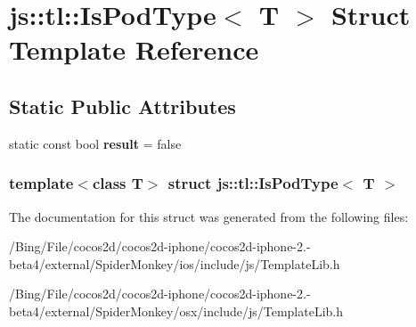 \hypertarget{structjs_1_1tl_1_1_is_pod_type}{\section{js\-:\-:tl\-:\-:Is\-Pod\-Type$<$ T $>$ Struct Template Reference}
\label{structjs_1_1tl_1_1_is_pod_type}
}
\subsection*{Static Public Attributes}
\begin{DoxyCompactItemize}
\item 
\hypertarget{structjs_1_1tl_1_1_is_pod_type_a50d8346c4465a22df722105604a09943}{static const bool {\bfseries result} = false}\label{structjs_1_1tl_1_1_is_pod_type_a50d8346c4465a22df722105604a09943}

\end{DoxyCompactItemize}
\subsubsection*{template$<$class T$>$ struct js\-::tl\-::\-Is\-Pod\-Type$<$ T $>$}



The documentation for this struct was generated from the following files\-:\begin{DoxyCompactItemize}
\item 
/\-Bing/\-File/cocos2d/cocos2d-\/iphone/cocos2d-\/iphone-\/2.-\/beta4/external/\-Spider\-Monkey/ios/include/js/Template\-Lib.\-h\item 
/\-Bing/\-File/cocos2d/cocos2d-\/iphone/cocos2d-\/iphone-\/2.-\/beta4/external/\-Spider\-Monkey/osx/include/js/Template\-Lib.\-h\end{DoxyCompactItemize}
